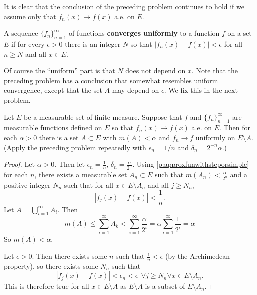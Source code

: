\begin{rmk}%
	It is clear that the conclusion of the preceding problem continues to hold 
	if we assume only that $f_n(x) \rightarrow f(x)$ a.e. on $E$. 
\end{rmk}

\begin{defn}\label{convergeuniformly}%
	A sequence $\{f_n\}_{n=1}^\infty$ of functions \textbf{converges uniformly} 
	to a function $f$ on a set $E$ if for every $\epsilon > 0$ there is an 
	integer $N$ so that $|f_n(x) - f(x)| < \epsilon$ for all $n \ge N$ and 
	all $x \in E$. 

	Of course the ``uniform'' part is that $N$ does not depend on $x$. Note 
	that the preceding problem has a conclusion that somewhat resembles uniform 
	convergence, except that the set $A$ may depend on $\epsilon$. We fix this 
	in the next problem. 
\end{defn}

\begin{pblm}\label{p:egoroff}%
	Let $E$ be a measurable set of finite measure. Suppose that $f$ and 
	$\{f_n\}_{n=1}^\infty$ are measurable functions defined on $E$ so that 
	$f_n(x) \rightarrow f(x)$ a.e. on $E$. Then for each $\alpha > 0$ there is 
	a set $A \subset E$ with $m(A) < \alpha$ and $f_n \rightarrow f$ uniformly 
	on $E\setminus A$. \\ (Apply the preceding problem repeatedly with 
	$\epsilon_n = 1/n$ and $\delta_n = 2^{-n}\alpha$.)
\begin{proof}
	Let $\alpha > 0$. Then let $\epsilon_n = \frac{1}{n}$, $\delta_n = \frac{\alpha}{2^n}$. 
	Using \ref{p:approxfunwithsteporsimple} for each $n$, there exists a measurable 
	set $A_n \subset E$ such that $m(A_n) < \frac{\alpha}{2^n}$ and a positive 
	integer $N_n$ such that for all $x \in E\setminus A_n$ and all $j \ge N_n$, 
	\begin{equation*}
		|f_j(x) - f(x)| < \frac{1}{n}. 
	\end{equation*}
	Let $A = \bigcup\limits_{i=1}^\infty A_i$. Then 
	\begin{equation*}
		m(A) \le \sum\limits_{i=1}^\infty A_k < \sum\limits_{i=1}^\infty\frac{\alpha}{2^i} = \alpha \sum\limits_{i=1}^\infty \frac{1}{2^i} = \alpha
	\end{equation*} 
	So $m(A) < \alpha$. 

	Let $\epsilon > 0$. Then there exists some $n$ such that $\frac{1}{n} < \epsilon$ 
	(by the Archimedean property), so there exists some $N_n$ such that 
	\begin{equation*}
		|f_j(x) - f(x)| < \epsilon_n < \epsilon ~~\forall j \ge N_n \forall x \in E\setminus A_n. 
	\end{equation*}
	This is therefore true for all $x \in E\setminus A$ as $E\setminus A$ is a 
	subset of $E \setminus A_n$. 
\end{proof}
\end{pblm}


